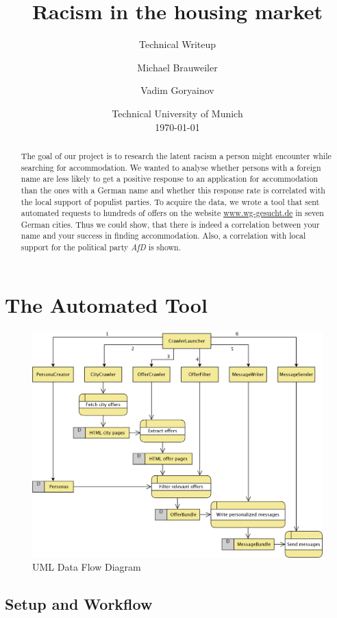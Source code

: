 \documentclass[11pt]{scrartcl}
\title{Racism in the housing market}
\subtitle{Technical Writeup}
\author{
    Michael Brauweiler\\
    \and
    Vadim Goryainov\\
}
\date{\footnotesize Technical University of Munich\\\smallskip\today
}
\begin{document}
\maketitle
\begin{abstract} \small
    The goal of our project is to research the latent racism a person might encounter while searching for accommodation. We wanted to analyse whether persons with a foreign name are less likely to get a positive response to an application for accommodation than the ones with a German name and whether this response rate is correlated with the local support of populist parties. To acquire the data, we wrote a tool that sent automated requests to hundreds of offers on the website \url{www.wg-gesucht.de} in seven German cities. Thus we could show, that there is indeed a correlation between your name and your success in finding accommodation. Also, a correlation with local support for the political party \textit{AfD} is shown.
\end{abstract}

\section{The Automated Tool}
\begin{figure}[H]
\centering
    \includegraphics[width=.73\textwidth]{images/DataFlow.png}
    \caption{UML Data Flow Diagram}
    \label{fig:data_flow}
\end{figure}

\subsection{Setup and Workflow}
\label{sec:setup}
\end{document}
